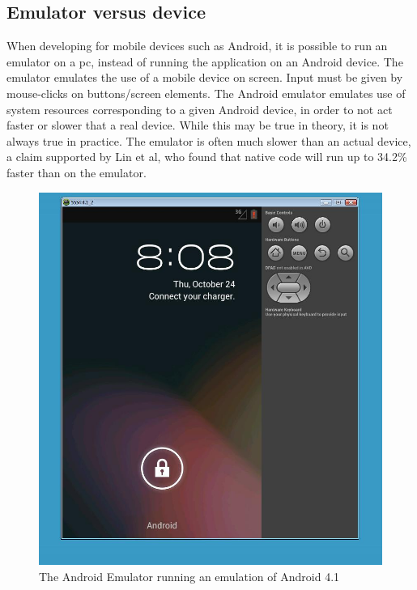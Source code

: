 \subsection{Emulator versus device}
When developing for mobile devices such as Android, it is possible to run an emulator on a pc, instead of running the application on an Android device. The emulator emulates the use of a mobile device on screen. Input must be given by mouse-clicks on buttons/screen elements. The Android emulator emulates use of system resources corresponding to a given Android device, in order to not act faster or slower that a real device. While this may be true in theory, it is not always true in practice. The emulator is often much slower than an actual device, a claim supported by Lin et al\cite{lin2011benchmark}, who found that native code will run up to 34.2\% faster than on the emulator.


\begin{figure}
\begin{center}
\includegraphics[scale=0.4]{Pictures/app-screenshots/androidemulator.png}
\end{center}
\caption{The Android Emulator running an emulation of Android 4.1}
\label{fig:androidemulator}
\end{figure}

